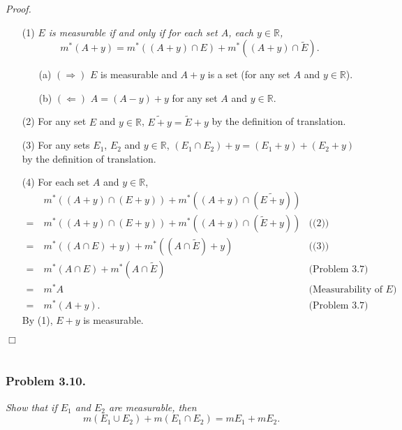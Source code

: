 \documentclass{article}
\begin{document}
\emph{Proof.}
\begin{enumerate}
\item[(1)]
  \emph{$E$ is measurable if and only if
  for each set $A$, each $y \in \mathbb{R}$,}
  \[
    m^{*}(A+y)
    = m^{*}((A+y) \cap E) + m^{*}((A+y) \cap \widetilde{E}).
  \]
  \begin{enumerate}
  \item[(a)]
    $(\Longrightarrow)$
    $E$ is measurable and
    $A+y$ is a set (for any set $A$ and $y \in \mathbb{R}$).

  \item[(b)]
    $(\Longleftarrow)$
    $A = (A-y) + y$ for any set $A$ and $y \in \mathbb{R}$.
  \end{enumerate}

\item[(2)]
  For any set $E$ and $y \in \mathbb{R}$,
  $\widetilde{E+y} = \widetilde{E}+y$ by the definition of translation.

\item[(3)]
  For any sets $E_1$, $E_2$ and $y \in \mathbb{R}$,
  $(E_1 \cap E_2)+y = (E_1+y) + (E_2+y)$ by the definition of translation.

\item[(4)]
  For each set $A$ and $y \in \mathbb{R}$,
  \begin{align*}
    &\: m^{*}((A+y) \cap (E+y)) + m^{*}((A+y) \cap (\widetilde{E+y})) \\
    =&\: m^{*}((A+y) \cap (E+y)) + m^{*}((A+y) \cap (\widetilde{E}+y))
      &\text{((2))} \\
    =&\: m^{*}((A \cap E)+y) + m^{*}((A \cap \widetilde{E})+y)
      &\text{((3))} \\
    =&\: m^{*}(A \cap E) + m^{*}(A \cap \widetilde{E})
      &\text{(Problem 3.7)} \\
    =&\: m^{*}A
      &\text{(Measurability of $E$)} \\
    =&\: m^{*}(A+y).
      &\text{(Problem 3.7)}
  \end{align*}
  By (1), $E+y$ is measurable.
\end{enumerate}
$\Box$ \\\\






\subsubsection*{Problem 3.10.}
\emph{Show that if $E_1$ and $E_2$ are measurable, then
$$m(E_1 \cup E_2) + m(E_1 \cap E_2) = mE_1 + mE_2.$$}
\end{document}
